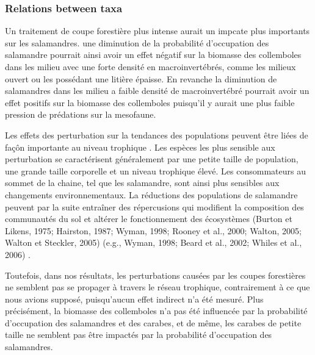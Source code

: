

\subsubsection*{Relations between taxa}
\label{disc:relations_between_taxa}



Un traitement de coupe forestière plus intense aurait un impcate plus importants sur les salamandres. 
une diminution de la probabilité d'occupation des salamandre pourrait ainsi avoir un effet négatif sur la biomasse des collemboles dans les milieu avec une forte densité en macroinvertébrés, comme les milieux ouvert ou les possédant une litière épaisse.
En revanche la diminution de salamandres dans les milieu a faible densité de macroinvertébré pourrait avoir un effet positifs sur la biomasse des collemboles puisqu'il y aurait une plus faible pression de prédations sur la mesofaune. 


Les effets des perturbation sur la tendances des populations peuvent être liées de façôn importante au niveau trophique \citep{Gotelli2006FoodWebModels}.  
Les espèces les plus sensible aux perturbation se caractérisent généralement par une petite taille de population, une grande taille corporelle et un niveau trophique élevé. 
Les consommateurs au sommet de la chaine, tel que les salamandre, sont ainsi plus sensibles aux changements environnementaux.
La réductions des populations de salamandre peuvent par la suite entraîner des répercusions qui modifient la composition des communautés du sol et altérer le fonctionnement des écosystèmes (Burton et Likens, 1975; Hairston, 1987; Wyman, 1998; Rooney et al., 2000; Walton, 2005; Walton et Steckler, 2005) (e.g., Wyman, 1998; Beard et al., 2002; Whiles et al., 2006) \citep{Wyman1998Experimentalassessment}. 

Toutefois, dans nos résultats, les perturbations causées par les coupes forestières ne semblent pas se propager à travers le réseau trophique, contrairement à ce que nous avions supposé, puisqu'aucun effet indirect n'a été mesuré. 
Plus précisément, la biomasse des collemboles n'a pas été influencée par la probabilité d'occupation des salamandres et des carabes, et de même, 
les carabes de petite taille ne semblent pas être impactés par la probabilité d'occupation des salamandres.

